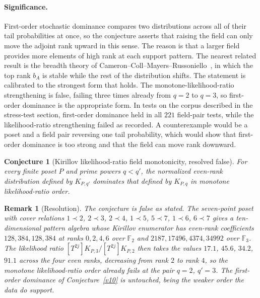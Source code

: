 \documentclass[11pt]{article}
\newtheorem{conjecture}{Conjecture}
\newtheorem{remark}{Remark}
\theoremstyle{definition}
\newcommand{\Fq}{\mathbb F}
\begin{document}
\paragraph{Significance.}
First-order stochastic dominance compares two distributions across all of their tail probabilities at once, so the conjecture asserts that raising the field can only move the adjoint rank upward in this sense.  The reason is that a larger field provides more elements of high rank at each support pattern.  The nearest related result is the breadth theory of Cameron--Coll--Mayers--Russoniello~\cite{CCMR}, in which the top rank $b_A$ is stable while the rest of the distribution shifts.  The statement is calibrated to the strongest form that holds.  The monotone-likelihood-ratio strengthening is false, failing three times already from $q=2$ to $q=3$, so first-order dominance is the appropriate form.  In tests on the corpus described in the stress-test section, first-order dominance held in all $221$ field-pair tests, while the likelihood-ratio strengthening failed as recorded.  A counterexample would be a poset and a field pair reversing one tail probability, which would show that first-order dominance is too strong and that the field can move rank downward.

\begin{conjecture}[Kirillov likelihood-ratio field monotonicity, resolved false]\label{v11}
For every finite poset $P$ and prime powers $q<q'$, the normalized even-rank distribution defined by $K_{P,q'}$ dominates that defined by $K_{P,q}$ in monotone likelihood-ratio order.
\end{conjecture}

\begin{remark}[Resolution]\label{v11:res}
The conjecture is false as stated.  The seven-point poset with cover relations $1\prec2$, $2\prec3$, $2\prec4$, $1\prec5$, $5\prec7$, $1\prec6$, $6\prec7$ gives a ten-dimensional pattern algebra whose Kirillov enumerator has even-rank coefficients $128,384,128,384$ at ranks $0,2,4,6$ over $\Fq_2$ and $2187,17496,4374,34992$ over $\Fq_3$.  The likelihood ratio $[T^{2j}]K_{P,3}/[T^{2j}]K_{P,2}$ then takes the values $17.1$, $45.6$, $34.2$, $91.1$ across the four even ranks, decreasing from rank $2$ to rank $4$, so the monotone likelihood-ratio order already fails at the pair $q=2$, $q'=3$.  The first-order dominance of Conjecture~\ref{v10} is untouched, being the weaker order the data do support.
\end{remark}
\end{document}
